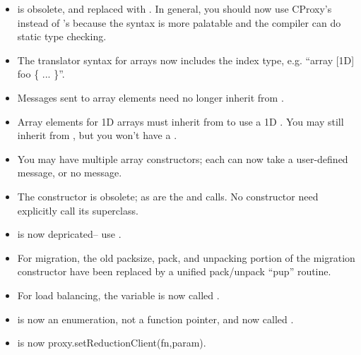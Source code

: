 \begin{itemize}

\item {} is obsolete, and replaced with .  In general,
you should now use CProxy's instead of 's because the syntax
is more palatable and the compiler can do static type checking.

\item The translator syntax for arrays now includes the index type,
e.g. ``array [1D] foo \{ ... \}''.

\item Messages sent to array elements need no longer inherit from 
.

\item Array elements for 1D arrays must inherit from  to use
a 1D .  You may still inherit from , but you
won't have a .

\item You may have multiple array constructors; each can now take a
user-defined message, or no message.  

\item The  constructor is obsolete;
as are the  and  calls. No
constructor need explicitly call its superclass.

\item {} is now depricated-- use 
.

\item For migration, the old packsize, pack, and unpacking portion of
the migration constructor have been replaced by a unified pack/unpack 
``pup'' routine.

\item For load balancing, the  variable is now called
.

\item {} is now an enumeration, not a function pointer,
and now called .

\item {} is now
proxy.setReductionClient(fn,param). 

\end{itemize}



